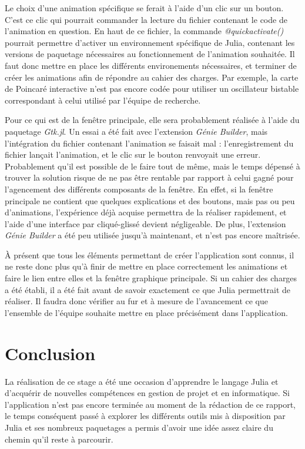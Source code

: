 \documentclass[a4paper, french, 12pt, titlepage]{article}
\begin{document}
Le choix d'une animation spécifique se ferait à l'aide d'un clic sur un bouton.
C'est ce clic qui pourrait commander la lecture du fichier contenant le code de l'animation en question.
En haut de ce fichier, la commande \emph{@quickactivate()} pourrait permettre d'activer un environnement spécifique de Julia, contenant les versions de paquetage nécessaires au fonctionnement de l'animation souhaitée.
Il faut donc mettre en place les différents environements nécessaires, et terminer de créer les animations afin de répondre au cahier des charges.
Par exemple, la carte de Poincaré interactive n'est pas encore codée pour utiliser un oscillateur bistable correspondant à celui utilisé par l'équipe de recherche. 

Pour ce qui est de la fenêtre principale, elle sera probablement réalisée à l'aide du paquetage \emph{Gtk.jl}.
Un essai a été fait avec l'extension \emph{Génie Builder}, mais l'intégration du fichier contenant l'animation se faisait mal : l'enregistrement du fichier lançait l'animation, et le clic sur le bouton renvoyait une erreur.
Probablement qu'il est possible de le faire tout de même, mais le temps dépensé à trouver la solution risque de ne pas être rentable par rapport à celui gagné pour l'agencement des différents composants de la fenêtre.
En effet, si la fenêtre principale ne contient que quelques explications et des boutons, mais pas ou peu d'animations, l'expérience déjà acquise permettra de la réaliser rapidement, et l'aide d'une interface par cliqué-glissé devient négligeable.
De plus, l'extension \emph{Génie Builder} a été peu utilisée jusqu'à maintenant, et n'est pas encore maîtrisée. 

À présent que tous les éléments permettant de créer l'application sont connus, il ne reste donc plus qu'à finir de mettre en place correctement les animations et faire le lien entre elles et la fenêtre graphique principale.
Si un cahier des charges a été établi, il a été fait avant de savoir exactement ce que Julia permettrait de réaliser.
Il faudra donc vérifier au fur et à mesure de l'avancement ce que l'ensemble de l'équipe souhaite mettre en place précisément dans l'application.

\newpage

\section{Conclusion}

La réalisation de ce stage a été une occasion d'apprendre le langage Julia et d'acquérir de nouvelles compétences en gestion de projet et en informatique.
Si l'application n'est pas encore terminée au moment de la rédaction de ce rapport, le temps conséquent passé à explorer les différents outils mis à disposition par Julia et ses nombreux paquetages a permis d'avoir une idée assez claire du chemin qu'il reste à parcourir. \\
\end{document}
